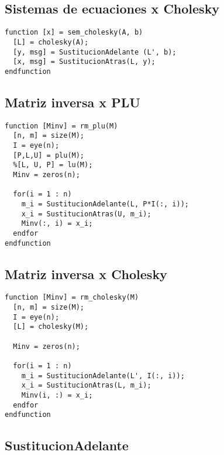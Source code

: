 \documentclass[10pt]{article}
\begin{document}
{}
\subsection*{Sistemas de ecuaciones x Cholesky}

\begin{lstlisting}
function [x] = sem_cholesky(A, b)
  [L] = cholesky(A);
  [y, msg] = SustitucionAdelante (L', b);
  [x, msg] = SustitucionAtras(L, y);
endfunction
\end{lstlisting}


{}
\subsection*{Matriz inversa x PLU}

\begin{lstlisting}
function [Minv] = rm_plu(M)
  [n, m] = size(M);
  I = eye(n);
  [P,L,U] = plu(M);
  %[L, U, P] = lu(M);
  Minv = zeros(n);
  
  for(i = 1 : n)
    m_i = SustitucionAdelante(L, P*I(:, i));
    x_i = SustitucionAtras(U, m_i);
    Minv(:, i) = x_i;
  endfor
endfunction
\end{lstlisting}


{}
\subsection*{Matriz inversa x Cholesky}

\begin{lstlisting}
function [Minv] = rm_cholesky(M)
  [n, m] = size(M);
  I = eye(n);
  [L] = cholesky(M);
  
  Minv = zeros(n);
  
  for(i = 1 : n)
    m_i = SustitucionAdelante(L', I(:, i));
    x_i = SustitucionAtras(L, m_i);
    Minv(i, :) = x_i;
  endfor
endfunction
\end{lstlisting}


{}
\subsection*{SustitucionAdelante}
\end{document}
